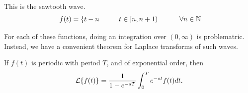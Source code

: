 \documentclass[fleqn,letterpaper]{report}
\begin{document}
\begin{example}
This is the sawtooth wave. 
\begin{equation*} \
f(t) = \left\{ t-n \hspace{1cm} t \in [n, n+1) \right.
\hspace{1cm} \forall n \in \mathbb{N}
\end{equation*}
\end{example}

For each of these functions, doing an integration over
$(0,\infty)$ is problematric. Instead, we have a convenient
theorem for Laplace transforms of such waves.

\begin{prop}
If $f(t)$ is periodic with period $T$, and of exponential
order, then 
\begin{equation*}
\mathcal{L}\{ f(t) \} = \frac{1}{1-e^{-sT}} \int_0^T e^{-st} f(t) dt.
\end{equation*}
\end{prop}
\end{document}
